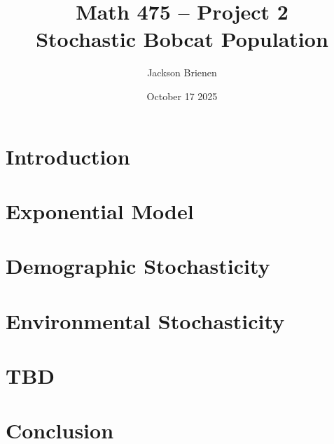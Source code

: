 \documentclass{article}
\title{Math 475 -- Project 2 \\ Stochastic Bobcat Population}
\author{Jackson Brienen}
\date{October 17 2025}
\begin{document}
\maketitle

\section{Introduction}

\section{Exponential Model}

\section{Demographic Stochasticity}

\section{Environmental Stochasticity}

\section{TBD}

\section{Conclusion}
\end{document}
